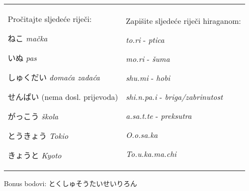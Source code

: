 	
	\begin{tabular}{p{200pt} p{200pt}}
		\begin{mondai}{Pročitajte sljedeće riječi:}
			\item ねこ \textit{mačka}
			\item いぬ \textit{pas}
			\item しゅくだい \textit{domaća zadaća}
			\item せんぱい (nema dosl. prijevoda)
			\item がっこう \textit{škola}
			\item とうきょう \textit{Tokio}
			\item きょうと \textit{Kyoto}
		\end{mondai}
		&
		\begin{mondai}{Zapišite sljedeće riječi hiraganom:}
			\item \textit{to.ri} - \textit{ptica}
			\item \textit{mo.ri} - \textit{šuma}
			\item \textit{shu.mi} - \textit{hobi}
			\item \textit{shi.n.pa.i} - \textit{briga/zabrinutost}
			\item \textit{a.sa.t.te} - \textit{preksutra}
			\item \textit{O.o.sa.ka}
			\item \textit{To.u.ka.ma.chi}
		\end{mondai}\\
	\end{tabular}
	
	Bonus bodovi: とくしゅそうたいせいりろん
	
